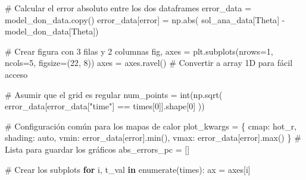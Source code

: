 \documentclass[
  spanish,
  us-letterpaper,
]{scrreprt}
\newenvironment{Shaded}{\begin{snugshade}}{\end{snugshade}}
\newcommand{\BuiltInTok}[1]{\textcolor[rgb]{0.00,0.23,0.31}{#1}}
\newcommand{\CommentTok}[1]{\textcolor[rgb]{0.37,0.37,0.37}{#1}}
\newcommand{\ControlFlowTok}[1]{\textcolor[rgb]{0.00,0.23,0.31}{\textbf{#1}}}
\newcommand{\DecValTok}[1]{\textcolor[rgb]{0.68,0.00,0.00}{#1}}
\newcommand{\KeywordTok}[1]{\textcolor[rgb]{0.00,0.23,0.31}{\textbf{#1}}}
\newcommand{\NormalTok}[1]{\textcolor[rgb]{0.00,0.23,0.31}{#1}}
\newcommand{\OperatorTok}[1]{\textcolor[rgb]{0.37,0.37,0.37}{#1}}
\newcommand{\StringTok}[1]{\textcolor[rgb]{0.13,0.47,0.30}{#1}}
\theoremstyle{definition}
\theoremstyle{plain}
\theoremstyle{remark}
\begin{document}
\begin{Shaded}
\begin{Highlighting}[]
\CommentTok{\# Calcular el error absoluto entre los dos dataframes}
\NormalTok{error\_data }\OperatorTok{=}\NormalTok{ model\_don\_data.copy()}
\NormalTok{error\_data[}\StringTok{\textquotesingle{}error\textquotesingle{}}\NormalTok{] }\OperatorTok{=}\NormalTok{ np.}\BuiltInTok{abs}\NormalTok{(}
\NormalTok{                    sol\_ana\_data[}\StringTok{\textquotesingle{}Theta\textquotesingle{}}\NormalTok{] }\OperatorTok{{-}}\NormalTok{ model\_don\_data[}\StringTok{\textquotesingle{}Theta\textquotesingle{}}\NormalTok{])}

\CommentTok{\# Crear figura con 3 filas y 2 columnas}
\NormalTok{fig, axes }\OperatorTok{=}\NormalTok{ plt.subplots(nrows}\OperatorTok{=}\DecValTok{1}\NormalTok{, ncols}\OperatorTok{=}\DecValTok{5}\NormalTok{, figsize}\OperatorTok{=}\NormalTok{(}\DecValTok{22}\NormalTok{, }\DecValTok{8}\NormalTok{))}
\NormalTok{axes }\OperatorTok{=}\NormalTok{ axes.ravel()  }\CommentTok{\# Convertir a array 1D para fácil acceso}

\CommentTok{\# Asumir que el grid es regular}
\NormalTok{num\_points }\OperatorTok{=} \BuiltInTok{int}\NormalTok{(np.sqrt(}
\NormalTok{                    error\_data[error\_data[}\StringTok{"time"}\NormalTok{] }\OperatorTok{==}\NormalTok{ times[}\DecValTok{0}\NormalTok{]].shape[}\DecValTok{0}\NormalTok{]}
\NormalTok{                    ))}

\CommentTok{\# Configuración común para los mapas de calor}
\NormalTok{plot\_kwargs }\OperatorTok{=}\NormalTok{ \{}
    \StringTok{\textquotesingle{}cmap\textquotesingle{}}\NormalTok{: }\StringTok{\textquotesingle{}hot\_r\textquotesingle{}}\NormalTok{,}
    \StringTok{\textquotesingle{}shading\textquotesingle{}}\NormalTok{: }\StringTok{\textquotesingle{}auto\textquotesingle{}}\NormalTok{,}
    \StringTok{\textquotesingle{}vmin\textquotesingle{}}\NormalTok{: error\_data[}\StringTok{\textquotesingle{}error\textquotesingle{}}\NormalTok{].}\BuiltInTok{min}\NormalTok{(),}
    \StringTok{\textquotesingle{}vmax\textquotesingle{}}\NormalTok{: error\_data[}\StringTok{\textquotesingle{}error\textquotesingle{}}\NormalTok{].}\BuiltInTok{max}\NormalTok{()}
\NormalTok{\}}
\CommentTok{\# Lista para guardar los gráficos}
\NormalTok{abs\_errors\_pc }\OperatorTok{=}\NormalTok{ []}

\CommentTok{\# Crear los subplots}
\ControlFlowTok{for}\NormalTok{ i, t\_val }\KeywordTok{in} \BuiltInTok{enumerate}\NormalTok{(times):}
\NormalTok{    ax }\OperatorTok{=}\NormalTok{ axes[i]}
    

\end{Highlighting}
\end{Shaded}
\end{document}
